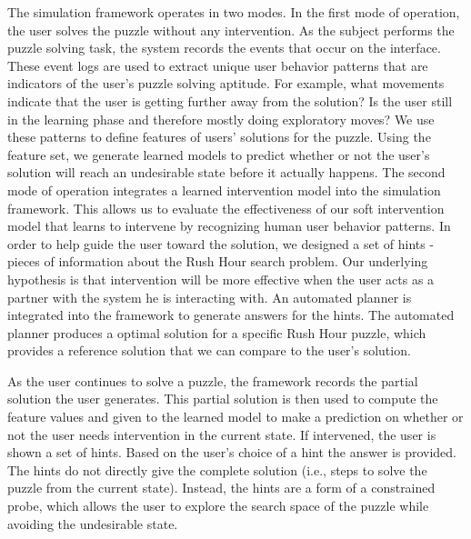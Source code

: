 \documentclass[doctor]{thesis} %
\theoremstyle{plain}
\begin{document}
The simulation framework operates in two modes. In the first mode of operation, the user solves the puzzle without any intervention. As the subject performs the puzzle solving task, the system records the events that occur on the interface. These event logs are used to extract unique user behavior patterns that are indicators of the user's puzzle solving aptitude. For example, what movements indicate that the user is getting further away from the solution? Is the user still in the learning phase and therefore mostly doing exploratory moves? We use these patterns to define features of users' solutions for the puzzle. Using the feature set, we generate learned models to predict whether or not the user's solution will reach an undesirable state before it actually happens. The second mode of operation integrates a learned intervention model into the simulation framework. This allows us to evaluate the effectiveness of our soft intervention model that learns to intervene by recognizing human user behavior patterns. In order to help guide the user toward the solution, we designed a set of hints - pieces of information about the Rush Hour search problem. Our underlying hypothesis is that intervention will be more effective when the user acts as a partner with the system he is interacting with. An automated planner is integrated into the framework to generate answers for the hints. The automated planner produces a optimal solution for a specific Rush Hour puzzle, which provides a reference solution that we can compare to the user's solution.

As the user continues to solve a puzzle, the framework records the partial solution the user generates. This partial solution is then used to compute the feature values and given to the learned model to make a prediction on whether or not the user needs intervention in the current state. If intervened, the user is shown a set of hints. Based on the user's choice of a hint the answer is provided. The hints do not directly give the complete solution (i.e., steps to solve the puzzle from the current state). Instead, the hints are a form of a constrained probe, which allows the user to explore the search space of the puzzle while avoiding the undesirable state.
\end{document}
